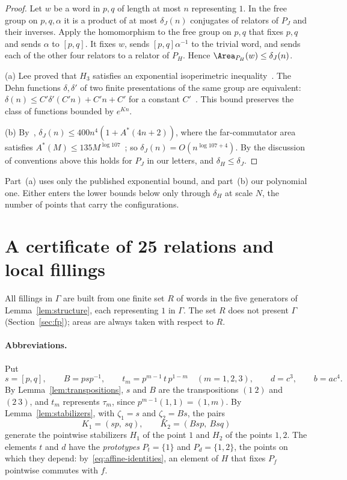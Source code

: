 \begin{proof}
Let $w$ be a word in $p,q$ of length at most $n$ representing $1$. In the free group on $p,q,\alpha$ it is a product of at most $\delta_J(n)$
conjugates of relators of $P_J$ and their inverses. Apply the homomorphism to the free group on $p,q$ that fixes $p,q$ and sends $\alpha$ to
$[p,q]$. It fixes $w$, sends $[p,q]\alpha^{-1}$ to the trivial word, and sends each of the other four relators to a relator of $P_H$. Hence
$\Area_{P_H}(w)\le\delta_J(n)$.

(a) Lee proved that $H_3$ satisfies an exponential isoperimetric inequality~\cite[Theorem~D]{Lee2012}. The Dehn functions $\delta,\delta'$ of two finite
presentations of the same group are equivalent: $\delta(n)\le C'\delta'(C'n)+C'n+C'$ for a constant $C'$~\cite{Bridson2002}. This bound
preserves the class of functions bounded by $e^{Kn}$.

(b) By~\cite[Theorem~3.3]{DouglasMghirbiA}, $\delta_J(n)\le400n^4(1+A^*(4n+2))$, where the far-commutator area satisfies
$A^*(M)\le135M^{\log107}$~\cite[Theorem~3.2]{DouglasMghirbiA}; so $\delta_J(n)=O(n^{\log107+4})$. By the discussion of conventions above this
holds for $P_J$ in our letters, and $\delta_H\le\delta_J$.
\end{proof}

Part~(a) uses only the published exponential bound, and part~(b) our polynomial one. Either enters the lower bounds below only through
$\delta_H$ at scale $N$, the number of points that carry the configurations.

\section{A certificate of 25 relations and local fillings}\label{sec:certificate}

All fillings in $\Gamma$ are built from one finite set $R$ of words in the five generators of Lemma~\ref{lem:structure}, each representing $1$
in $\Gamma$. The set $R$ does not present $\Gamma$ (Section~\ref{sec:fp}); areas are always taken with respect to $R$.

\paragraph{Abbreviations.} Put
\[
s=[p,q],\qquad B=psp^{-1},\qquad t_m=p^{m-1}\,t\,p^{1-m}\quad(m=1,2,3),\qquad d=c^3,\qquad b=ac^4 .
\]
By Lemma~\ref{lem:transpositions}, $s$ and $B$ are the transpositions $(1\ 2)$ and $(2\ 3)$, and $t_m$ represents $\tau_m$, since
$p^{m-1}(1,1)=(1,m)$. By Lemma~\ref{lem:stabilizers}, with $\zeta_1=s$ and $\zeta_2=Bs$, the pairs
\[
K_1=(sp,\ sq),\qquad K_2=(Bsp,\ Bsq)
\]
generate the pointwise stabilizers $H_1$ of the point $1$ and $H_2$ of the points $1,2$. The elements $t$ and $d$ have the \emph{prototypes}
$P_t=\{1\}$ and $P_d=\{1,2\}$, the points on which they depend: by~\eqref{eq:affine-identities}, an element of $H$ that fixes $P_f$ pointwise
commutes with $f$.

